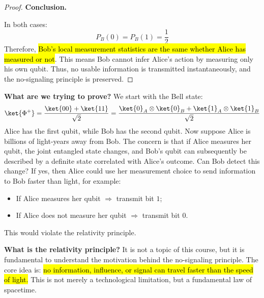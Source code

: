 \begin{proof}
    \highspace
    \textbf{Conclusion.}

    \noindent
    In both cases:
    \begin{equation*}
        P_B(0)=P_B(1)=\frac{1}{2}
    \end{equation*}
    Therefore, \hl{Bob's local measurement statistics are the same whether Alice has measured or not}. This means Bob cannot infer Alice's action by measuring only his own qubit. Thus, no usable information is transmitted instantaneously, and the no-signaling principle is preserved.
\end{proof}

\highspace
\textcolor{Green3}{ \textbf{What are we trying to prove?}} We start with the Bell state:
\begin{equation*}
    \ket{\Phi^+}
    =
    \frac{\ket{00}+\ket{11}}{\sqrt{2}}
    =
    \frac{\ket{0}_A \otimes \ket{0}_B+\ket{1}_A \otimes \ket{1}_B}{\sqrt{2}}
\end{equation*}
Alice has the first qubit, while Bob has the second qubit. Now suppose Alice is billions of light-years away from Bob. The concern is that if Alice measures her qubit, the joint entangled state changes, and Bob's qubit can subsequently be described by a definite state correlated with Alice's outcome. Can Bob detect this change? If yes, then Alice could use her measurement choice to send information to Bob faster than light, for example:
\begin{itemize}
    \item If Alice measures her qubit $\Rightarrow$ transmit bit $1$;
    \item If Alice does not measure her qubit $\Rightarrow$ transmit bit $0$.
\end{itemize}
This would violate the relativity principle.

\highspace
\textcolor{Green3}{ \textbf{What is the relativity principle?}} It is not a topic of this course, but it is fundamental to understand the motivation behind the no-signaling principle. The  core idea is: \hl{no information, influence, or signal can travel faster than the speed of light.} This is not merely a technological limitation, but a fundamental law of spacetime.

